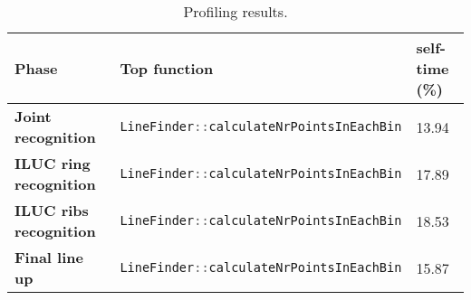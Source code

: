 \begin{table}[H]
    \centering
    \begin{tabular}{|p{4cm}|p{7cm}|p{2.5cm}|}
        \hline
        \textbf{Phase}                 & \textbf{Top function}                                          & \textbf{self-time (\%)} \\ \hline
        \textbf{Joint recognition}     & \lstinline[language=c]|LineFinder::calculateNrPointsInEachBin| & 13.94                   \\ \hline
        \textbf{ILUC ring recognition} & \lstinline[language=c]|LineFinder::calculateNrPointsInEachBin| & 17.89                   \\ \hline
        \textbf{ILUC ribs recognition} & \lstinline[language=c]|LineFinder::calculateNrPointsInEachBin| & 18.53                   \\ \hline
        \textbf{Final line up}         & \lstinline[language=c]|LineFinder::calculateNrPointsInEachBin| & 15.87                   \\ \hline
    \end{tabular}
    \caption{Profiling results.}
    \label{tab:profiling_results}
\end{table}